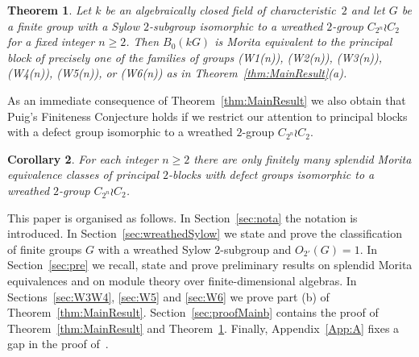 \documentclass[12pt,a4paper]{amsart}
\theoremstyle{plain}\newtheorem{Theorem}{Theorem}[section]
\theoremstyle{plain}\newtheorem{Conjecture}[Theorem]{Conjecture}
\theoremstyle{plain}\newtheorem{Corollary}[Theorem]{Corollary}
\theoremstyle{plain}\newtheorem{Lemma}[Theorem]{Lemma}
\theoremstyle{plain}\newtheorem{Proposition}[Theorem]{Proposition}
\theoremstyle{definition}\newtheorem{Definition}[Theorem]{Definition}
\theoremstyle{definition}\newtheorem{Example}[Theorem]{Example}
\theoremstyle{definition}\newtheorem{Examples}[Theorem]{Examples}
\theoremstyle{definition}\newtheorem{Remark}[Theorem]{Remark}
\theoremstyle{definition}\newtheorem{Question}[Theorem]{Question}
\theoremstyle{definition}\newtheorem{Notation}[Theorem]{Notation}
\theoremstyle{definition}\newtheorem{Hypothesis}[Theorem]{Hypothesis}
\theoremstyle{definition}\newtheorem{Assumption}[Theorem]{Assumption}
\theoremstyle{definition}\newtheorem{Strategy}[Theorem]{Strategy}
\theoremstyle{definition}\newtheorem{Contents}[Theorem]{Contents}
\theoremstyle{definition}\newtheorem{Computations}[Theorem]{Computations}
\theoremstyle{definition}\newtheorem{Equivalences}[Theorem]{Equivalences}
\theoremstyle{definition}\newtheorem{Notation/Definition}[Theorem]{Notation/Definition}
\theoremstyle{definition}\newtheorem{noth}[Theorem]{}
\theoremstyle{plain}\newtheorem{Step}[Theorem]{Step}
\begin{document}
\begin{Theorem}\label{thm:MoritaClasses}%
Let $k$ be an algebraically closed field of characteristic~$2$ and 
let $G$ be a finite group with a Sylow $2$-subgroup  
isomorphic to a wreathed $2$-group $C_{2^n}\wr C_2$ for a fixed integer $n\geq 2$. 
Then $B_{0}(kG)$ is Morita equivalent to the principal block of precisely one of the families of groups 
{\rm\sf (W1(n))}, {\rm\sf (W2(n))}, {\rm\sf (W3(n))}, {\rm\sf (W4(n))}, {\rm\sf (W5(n))}, or {\rm\sf (W6(n))}
as in  Theorem~\ref{thm:MainResult}(a).
\end{Theorem}


As an immediate consequence of Theorem~\ref{thm:MainResult} we also obtain that 
Puig's Finiteness Conjecture holds if we restrict our attention to principal blocks with a 
defect group isomorphic to a wreathed $2$-group $C_{2^n}\wr C_2$. 

\begin{Corollary}\label{cor:MainResult} 
For each integer $n\geq 2$ there are only finitely many 
splendid Morita equivalence classes of  
principal $2$-blocks with defect groups isomorphic to 
a wreathed $2$-group $C_{2^n}\wr C_2$. 
\end{Corollary}

This paper is organised as follows. In Section~\ref{sec:nota} 
the notation is introduced. In Section~\ref{sec:wreathedSylow} 
we state and prove the classification of finite groups $G$ with a wreathed Sylow $2$-subgroup 
and $O_{2'}(G)=1$. In Section~\ref{sec:pre} 
we recall, state and prove preliminary results on 
splendid Morita equivalences and on module theory over finite-dimensional algebras.
In Sections~\ref{sec:W3W4}, \ref{sec:W5} and \ref{sec:W6} we prove part (b) 
of Theorem~\ref{thm:MainResult}.  Section~\ref{sec:proofMainb} contains the proof of Theorem~\ref{thm:MainResult} 
and Theorem~\ref{thm:MoritaClasses}. Finally, Appendix~\ref{App:A} fixes a gap in the proof of~\cite[Proposition~3.3(b)]{KL20b}.
\end{document}
